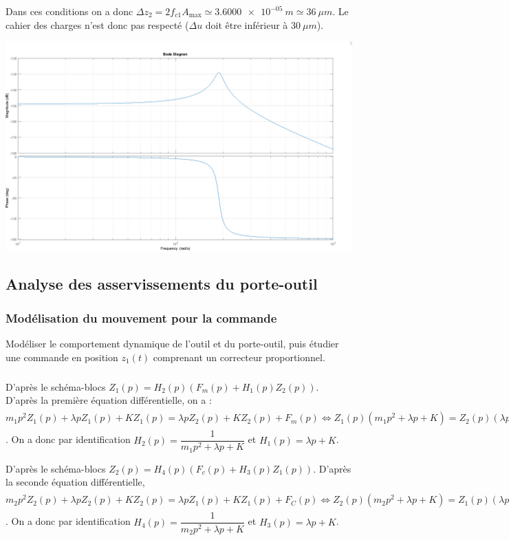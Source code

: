 \documentclass[10pt,fleqn]{article} %
\begin{document}
Dans ces conditions on a donc $\Delta z_2 = 2 f_{c1} A_{\text{max}}\simeq \SI{3.6000e-05}{m} \simeq \SI{36}{\mu m} $. Le cahier des charges n'est donc pas respecté ($\Delta u$ doit être inférieur à $\SI{30}{\mu m}$).
\begin{center}
\includegraphics[width=.8\linewidth]{images/fig_08}
\end{center}


\subsection{Analyse des asservissements du porte-outil}
\subsubsection{Modélisation du mouvement pour la commande}

\begin{obj}
Modéliser le comportement dynamique de l’outil et du porte-outil, puis étudier une commande  en position $z_1(t)$ comprenant un correcteur proportionnel.
\end{obj}

\subparagraph{}

D'après le schéma-blocs $Z_1(p)=H_2(p)\left(F_m(p)+H_1(p)Z_2(p)\right)$. 
D'après la première équation différentielle, on a : $m_1p^2 Z_1(p) + \lambda pZ_1(p)+KZ_1(p)=\lambda pZ_2(p)+KZ_2(p)+F_m(p)\Leftrightarrow 
Z_1(p)\left(m_1p^2  + \lambda p+K \right)=Z_2(p)\left(\lambda p+K\right)+F_m(p)
\Leftrightarrow 
Z_1(p)= \dfrac{Z_2(p)\left(\lambda p+K\right)+F_m(p)}{m_1p^2  + \lambda p+K}$.
On a donc par identification $H_2(p)=\dfrac{1}{m_1p^2  + \lambda p+K}$ et $H_1(p)=\lambda p+K$.

D'après le schéma-blocs $Z_2(p)=H_4(p)\left(F_c(p)+H_3(p)Z_1(p)\right)$. D'après la seconde équation différentielle,  $m_2p^2 Z_2(p) + \lambda pZ_2(p)+KZ_2(p)=\lambda pZ_1(p)+KZ_1(p)+F_C(p)\Leftrightarrow Z_2(p)\left( m_2p^2  + \lambda p+K \right)=Z_1(p)\left(\lambda p+K\right)+F_C(p)\Leftrightarrow Z_2(p)=\dfrac{Z_1(p)\left(\lambda p+K\right)+F_C(p)}{ m_2p^2  + \lambda p+K}$.
On a donc par identification $H_4(p)=\dfrac{1}{m_2p^2  + \lambda p+K}$ et $H_3(p)=\lambda p+K$.
\end{document}
